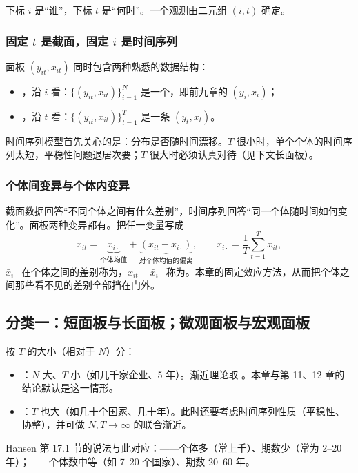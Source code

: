 下标 $i$ 是“谁”，下标 $t$ 是“何时”。一个观测由二元组 $(i,t)$ 确定。

\subsubsection{固定 \texorpdfstring{$t$}{t} 是截面，固定 \texorpdfstring{$i$}{i} 是时间序列}

面板 $(y_{it},x_{it})$ 同时包含两种熟悉的数据结构：
\begin{itemize}
  \item {}，沿 $i$ 看：$\{(y_{it},x_{it})\}_{i=1}^N$ 是一个，即前九章的 $(y_i,x_i)$；
  \item {}，沿 $t$ 看：$\{(y_{it},x_{it})\}_{t=1}^T$ 是一条 $(y_t,x_t)$。
\end{itemize}
时间序列模型首先关心的是：分布是否随时间漂移。$T$ 很小时，单个个体的时间序列太短，平稳性问题退居次要；$T$ 很大时必须认真对待（见下文长面板）。

\subsubsection{个体间变异与个体内变异}

截面数据回答“不同个体之间有什么差别”，时间序列回答“同一个体随时间如何变化”。面板两种变异都有。把任一变量写成
\[
x_{it}=\underbrace{\bar x_{i\cdot}}_{\text{个体均值}}+\underbrace{(x_{it}-\bar x_{i\cdot})}_{\text{对个体均值的偏离}},\qquad \bar x_{i\cdot}=\frac1T\sum_{t=1}^T x_{it},
\]
$\bar x_{i\cdot}$ 在个体之间的差别称为，$x_{it}-\bar x_{i\cdot}$ 称为。本章的固定效应方法，从而把个体之间那些看不见的差别全部挡在门外。

\subsection{分类一：短面板与长面板；微观面板与宏观面板}

按 $T$ 的大小（相对于 $N$）分：
\begin{itemize}
  \item {}：$N$ 大、$T$ 小（如几千家企业、5 年）。渐近理论取 。本章与第 11、12 章的结论默认是这一情形。
  \item {}：$T$ 也大（如几十个国家、几十年）。此时还要考虑时间序列性质（平稳性、协整），并可做 $N,T\to\infty$ 的联合渐近。
\end{itemize}
Hansen 第 17.1 节的说法与此对应：——个体多（常上千）、期数少（常为 2–20 年）；——个体数中等（如 7–20 个国家）、期数 20–60 年。

